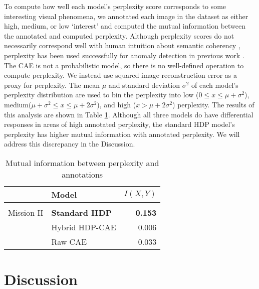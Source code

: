 \documentclass[letterpaper, 10 pt, conference]{ieeeconf}
\begin{document}
To compute how well each model's perplexity score corresponds to some interesting visual phenomena, we annotated each image in the dataset as either high, medium, or low `interest' and computed the mutual information between the annotated and computed perplexity. Although perplexity scores do not necessarily correspond well with human intuition about semantic coherency \cite{Chang2009}, perplexity has been used successfully for anomaly detection in previous work \cite{Girdhar2015}. The CAE is not a probabilistic model, so there is no well-defined operation to compute perplexity. We instead use squared image reconstruction error as a proxy for perplexity.  The mean $\mu$ and standard deviation $\sigma^2$ of each model's perplexity distribution are used to bin the perplexity into low ($0 \leq x \leq \mu + \sigma^2$), medium($\mu + \sigma^2 \leq x \leq \mu + 2\sigma^2$), and high ($x > \mu + 2\sigma^2$) perplexity. The results of this analysis are shown in Table \ref{tab:perp}. Although all three models do have differential responses in areas of high annotated perplexity, the standard HDP model's perplexity has higher mutual information with annotated perplexity. We will address this discrepancy in the Discussion.
     
\begin{table}[htb!]
\caption{Mutual information between \hspace{\textwidth} perplexity and annotations}
\label{tab:perp}
\centering
\begin{tabular}{ll|r}
     & Model & $I(X, Y)$ \\ \hline \\
        Mission II &    \textbf{Standard HDP} &     \textbf{0.153}\\
     &   Hybrid HDP-CAE &  0.006 \\ 
     &   Raw CAE &     0.033\\ 
\end{tabular}
\end{table}
    
 \section{Discussion} \label{sec:disc}
\end{document}
